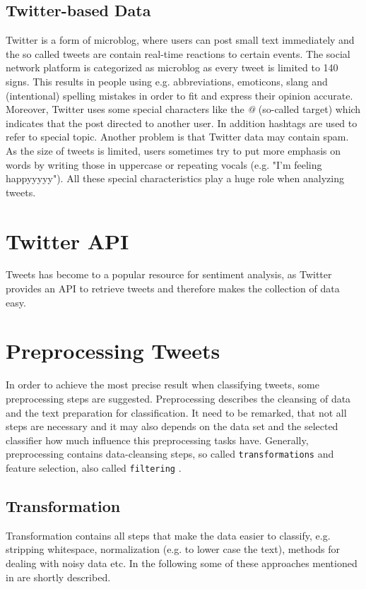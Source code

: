 \documentclass{acm_proc_article-sp}
\begin{document}
\subsection{Twitter-based Data} \label{twitter-based} 
Twitter is a form of microblog, where users can
post small text immediately and the so called tweets are contain real-time
reactions to certain events. The social network platform is categorized as
microblog as every tweet is limited to 140 signs. This results in people using
e.g. abbreviations, emoticons, slang and (intentional) spelling mistakes in order to fit
and express their opinion accurate. Moreover, Twitter uses some special
characters like the \emph{@} (so-called target) which indicates that the post directed to another
user. In addition hashtags are used to refer to special topic.  Another problem
is that Twitter data may contain spam.
As the size of tweets is limited, users sometimes try to put more emphasis on words by writing those in uppercase or repeating vocals (e.g. "I'm feeling happyyyyy").
 All these special characteristics play a
huge role when analyzing tweets. \cite{agarwal2011sentiment, read2005using}


\section{Twitter API} \label{twitterapi} Tweets has become to a popular
resource for sentiment analysis, as Twitter provides an API to retrieve tweets
and therefore makes the collection of data easy.


\section{Preprocessing Tweets} \label{preprocessing} In order to achieve the
most precise result when classifying tweets, some preprocessing steps are
suggested. Preprocessing describes the cleansing of data and the text preparation for classification. It need to be remarked, that not all steps are necessary and it may also depends on the data set and the selected classifier how much influence this preprocessing tasks have. 
Generally, preprocessing contains data-cleansing steps, so called \texttt{transformations} and feature selection, also called \texttt{filtering} \cite{haddi2013therole}.


\subsection{Transformation}
Transformation contains all steps that make the data easier to classify, e.g. stripping whitespace, normalization (e.g. to lower case the text), methods for dealing with noisy data etc. 
In the following some of these approaches mentioned in \cite{ting2011naive, pak2010twitter, go2009twitter, agarwal2011sentiment, pang2008opinion, haddi2013therole} are shortly described.
\end{document}
